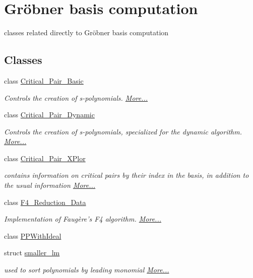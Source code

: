 \hypertarget{group___g_b_computation}{}\section{Gr\"{o}bner basis computation}
\label{group___g_b_computation}


classes related directly to Gr\"{o}bner basis computation  


\subsection*{Classes}
\begin{DoxyCompactItemize}
\item 
class \hyperlink{group___g_b_computation_class_critical___pair___basic}{Critical\+\_\+\+Pair\+\_\+\+Basic}
\begin{DoxyCompactList}\small\item\em Controls the creation of s-\/polynomials.  \hyperlink{group___g_b_computation_class_critical___pair___basic}{More...}\end{DoxyCompactList}\item 
class \hyperlink{group___g_b_computation_class_critical___pair___dynamic}{Critical\+\_\+\+Pair\+\_\+\+Dynamic}
\begin{DoxyCompactList}\small\item\em Controls the creation of s-\/polynomials, specialized for the dynamic algorithm.  \hyperlink{group___g_b_computation_class_critical___pair___dynamic}{More...}\end{DoxyCompactList}\item 
class \hyperlink{group___g_b_computation_class_critical___pair___x_plor}{Critical\+\_\+\+Pair\+\_\+\+X\+Plor}
\begin{DoxyCompactList}\small\item\em contains information on critical pairs by their index in the basis, in addition to the usual information  \hyperlink{group___g_b_computation_class_critical___pair___x_plor}{More...}\end{DoxyCompactList}\item 
class \hyperlink{group___g_b_computation_class_f4___reduction___data}{F4\+\_\+\+Reduction\+\_\+\+Data}
\begin{DoxyCompactList}\small\item\em Implementation of Faug\`{e}re's F4 algorithm.  \hyperlink{group___g_b_computation_class_f4___reduction___data}{More...}\end{DoxyCompactList}\item 
class \hyperlink{group___g_b_computation_class_p_p_with_ideal}{P\+P\+With\+Ideal}
\item 
struct \hyperlink{group___g_b_computation_structsmaller__lm}{smaller\+\_\+lm}
\begin{DoxyCompactList}\small\item\em used to sort polynomials by leading monomial  \hyperlink{group___g_b_computation_structsmaller__lm}{More...}\end{DoxyCompactList}\end{DoxyCompactItemize}
